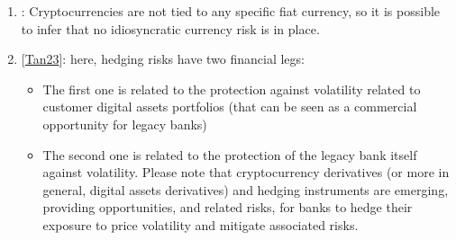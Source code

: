 \documentclass[letterpaper,10pt,english]{jupyterBook}
\begin{document}
\begin{enumerate}
\begin{itemize}
\item {} 
\sphinxAtStartPar
{}: lower interest rates can make cryptocurrencies relatively more attractive compared to traditional fixed\sphinxhyphen{}income investments that provide lower yields. Banks may consider increasing their exposure to cryptocurrencies as part of their investment strategy during periods of low interest rates.

\end{itemize}

\sphinxAtStartPar
Moreover, it’s worth noting that interest rate risk related to cryptocurrencies primarily arises when they are held as investment assets on a bank’s balance sheet. If cryptocurrencies are held for other purposes, such as providing custody {[}\hyperlink{cite.ARM/arm:id147}{20223}{]}or trading services, the interest rate risk may be less relevant. As with any investment asset, banks should have appropriate risk management policies and frameworks in place to assess and monitor interest rate risk associated with cryptocurrencies. This may involve stress testing, scenario analysis, and regular reviews to ensure the bank’s exposure to interest rate fluctuations aligns with its risk appetite and strategic objectives.

\item {} 
\sphinxAtStartPar
{}: Cryptocurrencies are not tied to any specific fiat currency, so it is possible to infer that no idiosyncratic currency risk is in place.

\item {} 
\sphinxAtStartPar
{} {[}\hyperlink{cite.ARM/arm:id149}{Tan23}{]}: here, hedging risks have two financial legs:
\begin{itemize}
\item {} 
\sphinxAtStartPar
The first one is related to the protection against volatility related to customer digital assets portfolios (that can be seen as a commercial opportunity for legacy banks)

\item {} 
\sphinxAtStartPar
The second one is related to the protection of the legacy bank itself against volatility. Please note that cryptocurrency derivatives (or more in general, digital assets derivatives) and hedging instruments are emerging, providing opportunities, and related risks, for banks to hedge their exposure to price volatility and mitigate associated risks.


\end{itemize}
\end{enumerate}
\end{document}

